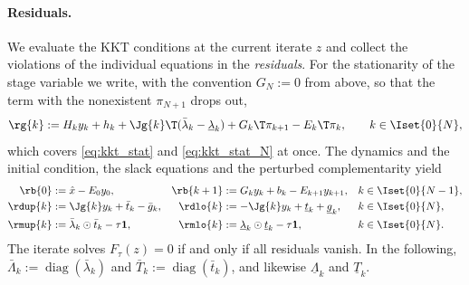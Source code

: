 \paragraph{Residuals.}
We evaluate the KKT conditions at the current iterate $z$ and collect the violations of the individual equations in the \textit{residuals}.
For the stationarity of the stage variable we write, with the convention $G_N := 0$ from above, so that the term with the nonexistent $\pi_{N+1}$ drops out,
\[
    \rg{k} := H_k y_k + h_k + \Jg{k}\T(\bar{\lambda}_k - \underline{\lambda}_k) + G_k\T \pi_{k+1} - E_k\T \pi_k ,
    \qquad k\in\Iset{0}{N},
\]
which covers \eqref{eq:kkt_stat} and \eqref{eq:kkt_stat_N} at once.
The dynamics and the initial condition, the slack equations and the perturbed complementarity yield
\begin{align*}
    \rb{0} &:= \hat{x} - E_0 y_0 , &
    \rb{k+1} &:= G_k y_k + b_k - E_{k+1} y_{k+1} , && k\in\Iset{0}{N-1}, \\
    \rdup{k} &:= \Jg{k} y_k + \bar{t}_k - \bar{g}_k , &
    \rdlo{k} &:= -\Jg{k} y_k + \underline{t}_k + \underline{g}_k , && k\in\Iset{0}{N}, \\
    \rmup{k} &:= \bar{\lambda}_k \odot \bar{t}_k - \tau \mathbf{1} , &
    \rmlo{k} &:= \underline{\lambda}_k \odot \underline{t}_k - \tau \mathbf{1} , && k\in\Iset{0}{N}.
\end{align*}
The iterate solves $F_\tau(z) = 0$ if and only if all residuals vanish.
In the following, $\bar{\Lambda}_k := \operatorname{diag}(\bar{\lambda}_k)$ and $\bar{T}_k := \operatorname{diag}(\bar{t}_k)$, and likewise $\underline{\Lambda}_k$ and $\underline{T}_k$.

